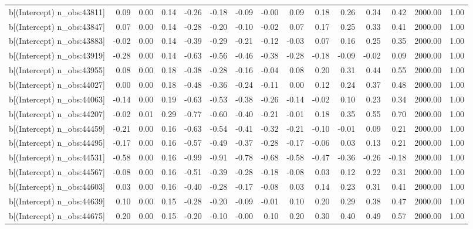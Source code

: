 \begin{table}[ht]
\begin{tabular}{rrrrrrrrrrrrrrr}
  b[(Intercept) n\_obs:43811] & 0.09 & 0.00 & 0.14 & -0.26 & -0.18 & -0.09 & -0.00 & 0.09 & 0.18 & 0.26 & 0.34 & 0.42 & 2000.00 & 1.00 \\ 
  b[(Intercept) n\_obs:43847] & 0.07 & 0.00 & 0.14 & -0.28 & -0.20 & -0.10 & -0.02 & 0.07 & 0.17 & 0.25 & 0.33 & 0.41 & 2000.00 & 1.00 \\ 
  b[(Intercept) n\_obs:43883] & -0.02 & 0.00 & 0.14 & -0.39 & -0.29 & -0.21 & -0.12 & -0.03 & 0.07 & 0.16 & 0.25 & 0.35 & 2000.00 & 1.00 \\ 
  b[(Intercept) n\_obs:43919] & -0.28 & 0.00 & 0.14 & -0.63 & -0.56 & -0.46 & -0.38 & -0.28 & -0.18 & -0.09 & -0.02 & 0.09 & 2000.00 & 1.00 \\ 
  b[(Intercept) n\_obs:43955] & 0.08 & 0.00 & 0.18 & -0.38 & -0.28 & -0.16 & -0.04 & 0.08 & 0.20 & 0.31 & 0.44 & 0.55 & 2000.00 & 1.00 \\ 
  b[(Intercept) n\_obs:44027] & 0.00 & 0.00 & 0.18 & -0.48 & -0.36 & -0.24 & -0.11 & 0.00 & 0.12 & 0.24 & 0.37 & 0.48 & 2000.00 & 1.00 \\ 
  b[(Intercept) n\_obs:44063] & -0.14 & 0.00 & 0.19 & -0.63 & -0.53 & -0.38 & -0.26 & -0.14 & -0.02 & 0.10 & 0.23 & 0.34 & 2000.00 & 1.00 \\ 
  b[(Intercept) n\_obs:44207] & -0.02 & 0.01 & 0.29 & -0.77 & -0.60 & -0.40 & -0.21 & -0.01 & 0.18 & 0.35 & 0.55 & 0.70 & 2000.00 & 1.00 \\ 
  b[(Intercept) n\_obs:44459] & -0.21 & 0.00 & 0.16 & -0.63 & -0.54 & -0.41 & -0.32 & -0.21 & -0.10 & -0.01 & 0.09 & 0.21 & 2000.00 & 1.00 \\ 
  b[(Intercept) n\_obs:44495] & -0.17 & 0.00 & 0.16 & -0.57 & -0.49 & -0.37 & -0.28 & -0.17 & -0.06 & 0.03 & 0.13 & 0.21 & 2000.00 & 1.00 \\ 
  b[(Intercept) n\_obs:44531] & -0.58 & 0.00 & 0.16 & -0.99 & -0.91 & -0.78 & -0.68 & -0.58 & -0.47 & -0.36 & -0.26 & -0.18 & 2000.00 & 1.00 \\ 
  b[(Intercept) n\_obs:44567] & -0.08 & 0.00 & 0.16 & -0.51 & -0.39 & -0.28 & -0.18 & -0.08 & 0.03 & 0.12 & 0.22 & 0.31 & 2000.00 & 1.00 \\ 
  b[(Intercept) n\_obs:44603] & 0.03 & 0.00 & 0.16 & -0.40 & -0.28 & -0.17 & -0.08 & 0.03 & 0.14 & 0.23 & 0.31 & 0.41 & 2000.00 & 1.00 \\ 
  b[(Intercept) n\_obs:44639] & 0.10 & 0.00 & 0.15 & -0.28 & -0.20 & -0.09 & -0.01 & 0.10 & 0.20 & 0.29 & 0.38 & 0.47 & 2000.00 & 1.00 \\ 
  b[(Intercept) n\_obs:44675] & 0.20 & 0.00 & 0.15 & -0.20 & -0.10 & -0.00 & 0.10 & 0.20 & 0.30 & 0.40 & 0.49 & 0.57 & 2000.00 & 1.00 \\ 

\end{tabular}
\end{table}
